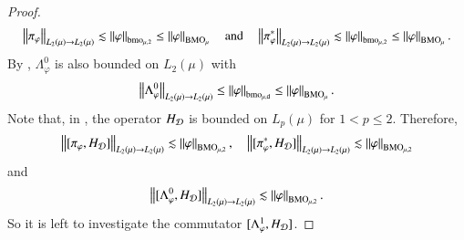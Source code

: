 \documentclass[leqno]{amsart}
\begin{document}
\begin{proof}
\begin{align*}
\left\| \pi_{\varphi} \right\|_{L_{2}(\mu)\rightarrow L_{2}(\mu)}
\lesssim\left\| \varphi \right\|_{{\rm bmo}_{\mu,2}}
\leq\left\| \varphi \right\|_{{\rm BMO}_{\mu}}
\quad\mbox{and}\quad
\left\| \pi_{\varphi}^{*} \right\|_{L_{2}(\mu)\rightarrow L_{2}(\mu)}
\lesssim\left\| \varphi \right\|_{{\rm bmo}_{\mu,2}}
\leq\left\| \varphi \right\|_{{\rm BMO}_{\mu}}.
\end{align*}
By , $\Lambda^{0}_{\varphi}$ is also bounded on $L_{2}(\mu)$ with
\begin{align*}
\left\| \Lambda^{0}_{\varphi} \right\|_{L_{2}(\mu)\rightarrow L_{2}(\mu)}
\leq\left\| \varphi \right\|_{{\rm bmo}_{\mu,\mathsf{d}}}
\leq \left\| \varphi \right\|_{{\rm BMO}_{\mu}}.
\end{align*}
Note that, in \cite[Theorem 2.5]{LMP2014}, the operator $H_{{\mathcal D}}$ is bounded on $L_{p}(\mu)$ for $1<p\leq2$. Therefore,
\begin{align*}
\left\| [\pi_{\varphi},H_{{\mathcal D}}] \right\|_{L_{2}(\mu)\rightarrow L_{2}(\mu)}
\lesssim \left\| \varphi \right\|_{{\rm BMO}_{\mu,2}},\quad
\left\| [\pi_{\varphi}^{*},H_{{\mathcal D}}] \right\|_{L_{2}(\mu)\rightarrow L_{2}(\mu)}
\lesssim \left\| \varphi \right\|_{{\rm BMO}_{\mu,2}}
\end{align*} 
and
\begin{align*}
\left\| [\Lambda^{0}_{\varphi},H_{{\mathcal D}}] \right\|_{L_{2}(\mu)\rightarrow L_{2}(\mu)}
\lesssim \left\| \varphi \right\|_{{\rm BMO}_{\mu,2}}.
\end{align*} 
So it is left to investigate the commutator $[\Lambda^{1}_{\varphi},H_{{\mathcal D}}]$.



\end{proof}
\end{document}
